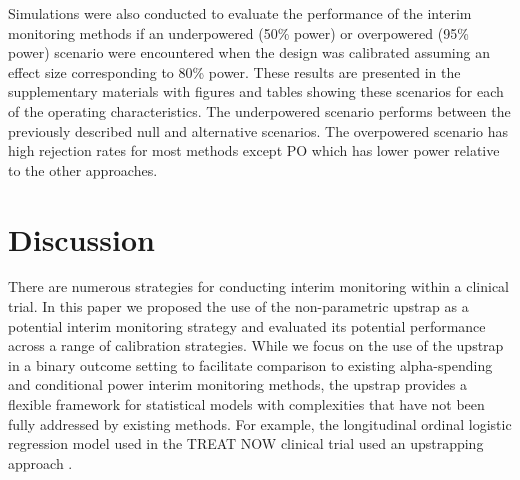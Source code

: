 \documentclass[Afour,sageh,times,square,numbers]{sagej}
\begin{document}
Simulations were also conducted to evaluate the performance of the interim monitoring methods if an underpowered (50\% power) or overpowered (95\% power) scenario were encountered when the design was calibrated assuming an effect size corresponding to 80\% power. These results are presented in the supplementary materials with figures and tables showing these scenarios for each of the operating characteristics. The underpowered scenario performs between the previously described null and alternative scenarios. The overpowered scenario has high rejection rates for most methods except PO which has lower power relative to the other approaches.



\section{Discussion}

There are numerous strategies for conducting interim monitoring within a clinical trial. In this paper we proposed the use of the non-parametric upstrap as a potential interim monitoring strategy and evaluated its potential performance across a range of calibration strategies. While we focus on the use of the upstrap in a binary outcome setting to facilitate comparison to existing alpha-spending and conditional power interim monitoring methods, the upstrap provides a flexible framework for statistical models with complexities that have not been fully addressed by existing methods. For example, the longitudinal ordinal logistic regression model used in the TREAT NOW clinical trial used an upstrapping approach \cite{R4, R9}.
\end{document}
